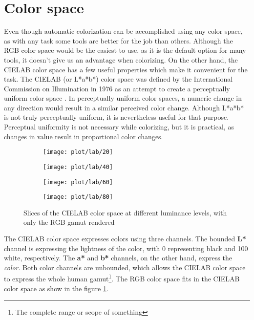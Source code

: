 \section{Color space}

Even though automatic colorization can be accomplished using any color space, 
as with any task some tools are better for the job than others. Although the 
RGB color space would be the easiest to use, as it is the default option for 
many tools, it doesn't give us an advantage when colorizing. On the other hand, 
the CIELAB color space has a few useful properties which make it convenient 
for the task. The CIELAB (or L*a*b*) color space was defined by the 
International Commission on Illumination in 1976 as an attempt to create a 
perceptually uniform color space \citep{icc2004cielab}. 
In perceptually uniform color spaces, a numeric change in any direction 
would result in a similar perceived color change. Although L*a*b* is not truly 
perceptually uniform, it is nevertheless useful for that purpose. Perceptual 
uniformity is not necessary while colorizing, but it is practical, as changes 
in value result in proportional color changes.

\begin{figure}[!h]
	\centering
	\begin{subfigure}{.24\textwidth}
		\centering
		\texttt{[image: plot/lab/20]}
	\end{subfigure}
	\begin{subfigure}{.24\textwidth}
		\centering
		\texttt{[image: plot/lab/40]}
	\end{subfigure}
	\begin{subfigure}{.24\textwidth}
		\centering
		\texttt{[image: plot/lab/60]}
	\end{subfigure}
	\begin{subfigure}{.24\textwidth}
		\centering
		\texttt{[image: plot/lab/80]}
	\end{subfigure}
    \caption{Slices of the CIELAB color space at different luminance levels, with only the RGB gamut rendered}
	\label{fig:rgb_in_lab}
\end{figure}

The CIELAB color space expresses colors using three channels. The bounded \textbf{L*}
channel is expressing the lightness of the color, with 0 representing black and 100 
white, respectively. The \textbf{a*} and \textbf{b*} channels, on the other hand, 
express the \textit{color}. Both color channels are unbounded, which allows the 
CIELAB color space to express the whole human gamut\footnote{The complete range 
or scope of something}. The RGB color space fits in the CIELAB color space 
as show in the figure \ref{fig:rgb_in_lab}.

